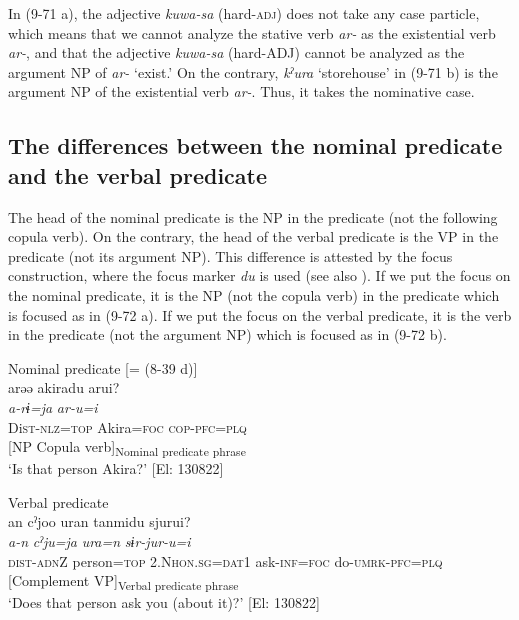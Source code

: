 In (9-71 a), the adjective \textit{kuwa-sa} (hard-\textsc{adj}) does not take any case particle, which means that we cannot analyze the stative verb \textit{ar-} as the existential verb \textit{ar-}, and that the adjective \textit{kuwa-sa} (hard-ADJ) cannot be analyzed as the argument NP of \textit{ar-} ‘exist.’ On the contrary, \textit{kˀura} ‘storehouse’ in (9-71 b) is the argument NP of the existential verb \textit{ar-}. Thus, it takes the nominative case.

\subsection{The differences between the nominal predicate and the verbal predicate}\label{sec:9.4.3}

The head of the nominal predicate is the NP in the predicate (not the following copula verb). On the contrary, the head of the verbal predicate is the VP in the predicate (not its argument NP). This difference is attested by the focus construction, where the focus marker \textit{du} is used (see also ). If we put the focus on the nominal predicate, it is the NP (not the copula verb) in the predicate which is focused as in (9-72 a). If we put the focus on the verbal predicate, it is the verb in the predicate (not the argument NP) which is focused as in (9-72 b).

\ea   \label{ex:9.72}
\ea Nominal predicate [= (8-39 d)]\\
 \gllll  arəə  akiradu  arui?\\
    \textit{a-rɨ=ja}  \textit{}  \textit{ar-u=i}\\
    Di\textsc{st}-\textsc{nlz}=\textsc{top}  Akira=\textsc{foc}  \textsc{cop}-\textsc{pfc}=\textsc{plq}\\
    {}  [NP  {Copula verb]\textsubscript{Nominal predicate phrase}}\\
    \glt     ‘Is that person Akira?’ [El: 130822]

\ex Verbal predicate\\
 \gllll  an  cˀjoo  uran  tanmidu  sjurui?\\
    \textit{a-n}  \textit{cˀju=ja}  \textit{ura=n}  \textit{}  \textit{sɨr-jur-u=i}\\
    \textsc{dist}{}-\textsc{adn}Z  person=\textsc{top}  2.N\textsc{hon}.\textsc{sg}=\textsc{dat}1  ask-\textsc{inf}=\textsc{foc}  do-\textsc{umrk}{}-\textsc{pfc}=\textsc{plq}\\
    {} {} {} [Complement  {VP]\textsubscript{Verbal predicate phrase}}\\
    \glt     ‘Does that person ask you (about it)?’ [El: 130822]
    \z
\z


